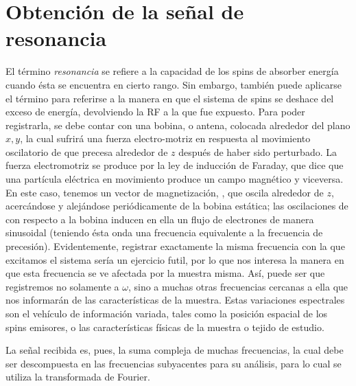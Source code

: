\section{Obtención de la señal de resonancia}
El término \emph{resonancia} se refiere a la capacidad de los spins de absorber energía cuando ésta se encuentra en cierto rango. Sin embargo, también puede aplicarse el término para referirse a la manera en que el sistema de spins se deshace del exceso de energía, devolviendo la RF a la que fue expuesto. Para poder registrarla, se debe contar con una bobina, o antena, colocada alrededor del plano $x,y$, la cual sufrirá una fuerza electro-motriz en respuesta al movimiento oscilatorio de \Mzero que precesa alrededor de $z$ después de haber sido perturbado. La fuerza electromotriz se produce por la ley de inducción de Faraday, que dice que una partícula eléctrica en movimiento produce un campo magnético y viceversa. En este caso, tenemos un vector de magnetización, \Mzero, que oscila alrededor de $z$, acercándose y alejándose periódicamente de la bobina estática; las oscilaciones de \Mzero con respecto a la bobina inducen en ella un flujo de electrones de manera sinusoidal (teniendo ésta onda una frecuencia equivalente a la frecuencia de precesión). Evidentemente, registrar exactamente la misma frecuencia con la que excitamos el sistema sería un ejercicio futil, por lo que nos interesa la manera en que esta frecuencia se ve afectada por la muestra misma. Así, puede ser que registremos no solamente a $\omega$, sino a muchas otras frecuencias cercanas a ella que nos informarán de las características de la muestra. Estas variaciones espectrales son el vehículo de información variada, tales como la posición espacial de los spins emisores, o las características físicas de la muestra o tejido de estudio. 

La señal recibida es, pues, la suma compleja de muchas frecuencias, la cual debe ser descompuesta en las frecuencias subyacentes para su análisis, para lo cual se utiliza la transformada de Fourier.



% 
